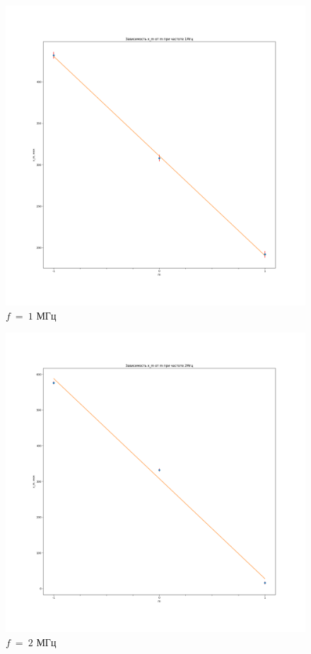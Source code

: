 \documentclass[a4paper, 12pt]{article}
\begin{document}
    \begin{figure}[!h]
        \centering
        \includegraphics[scale = 0.4]{graph1.png}
        \caption{$f~=~1$ МГц}
        \label{g1}
    \end{figure}

    \begin{figure}[!h]
        \centering
        \includegraphics[scale = 0.4]{graph2.png}
        \caption{$f~=~2$ МГц}
        \label{g2}
    \end{figure}
\end{document}

